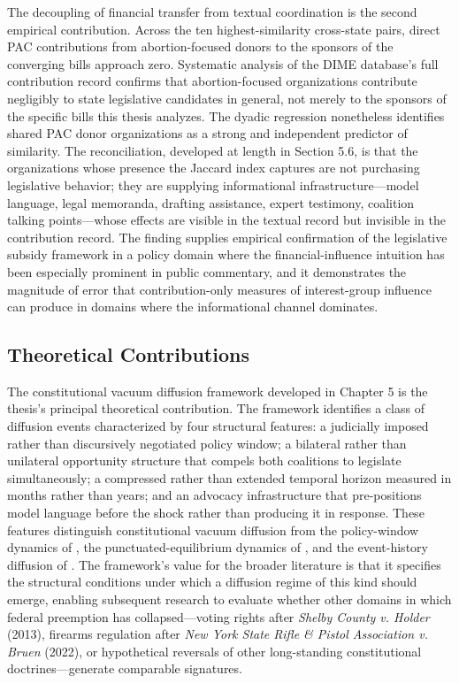 The decoupling of financial transfer from textual coordination is the second empirical contribution. Across the ten highest-similarity cross-state pairs, direct PAC contributions from abortion-focused donors to the sponsors of the converging bills approach zero. Systematic analysis of the DIME database's full contribution record confirms that abortion-focused organizations contribute negligibly to state legislative candidates in general, not merely to the sponsors of the specific bills this thesis analyzes. The dyadic regression nonetheless identifies shared PAC donor organizations as a strong and independent predictor of similarity. The reconciliation, developed at length in Section 5.6, is that the organizations whose presence the Jaccard index captures are not purchasing legislative behavior; they are supplying informational infrastructure---model language, legal memoranda, drafting assistance, expert testimony, coalition talking points---whose effects are visible in the textual record but invisible in the contribution record. The finding supplies empirical confirmation of the \textcite{hallLobbyingLegislativeSubsidy2006a} legislative subsidy framework in a policy domain where the financial-influence intuition has been especially prominent in public commentary, and it demonstrates the magnitude of error that contribution-only measures of interest-group influence can produce in domains where the informational channel dominates.
 
\subsection{Theoretical Contributions}
 
The constitutional vacuum diffusion framework developed in Chapter 5 is the thesis's principal theoretical contribution. The framework identifies a class of diffusion events characterized by four structural features: a judicially imposed rather than discursively negotiated policy window; a bilateral rather than unilateral opportunity structure that compels both coalitions to legislate simultaneously; a compressed rather than extended temporal horizon measured in months rather than years; and an advocacy infrastructure that pre-positions model language before the shock rather than producing it in response. These features distinguish constitutional vacuum diffusion from the policy-window dynamics of \textcite{kingdonAgendasAlternativesPublic2011a}, the punctuated-equilibrium dynamics of \textcite{baumgartnerLobbyingPolicyChange}, and the event-history diffusion of \textcite{berryStateLotteryAdoptions1990}. The framework's value for the broader literature is that it specifies the structural conditions under which a diffusion regime of this kind should emerge, enabling subsequent research to evaluate whether other domains in which federal preemption has collapsed---voting rights after \textit{Shelby County v. Holder} (2013), firearms regulation after \textit{New York State Rifle \& Pistol Association v. Bruen} (2022), or hypothetical reversals of other long-standing constitutional doctrines---generate comparable signatures.
 
